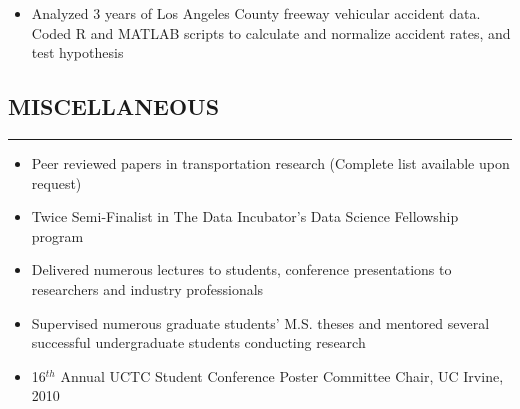 \documentclass[10pt,a4]{article}
\def\mydot{\textcolor{deep_blue}{\rule{0.75ex}{0.75ex}}}
\begin{document}
\begin{small}
\begin{itemize}
\item[\mydot] Analyzed 3 years of Los Angeles County freeway vehicular accident data. Coded R and MATLAB scripts to calculate and normalize accident rates, and test hypothesis
\end{itemize}



\vspace{-0.55cm}
\subsection*{\color{dark_blue} MISCELLANEOUS}
\vspace{-0.15cm}
\hrule
\vspace{0.1cm}
\begin{itemize}
\item[\mydot] Peer reviewed papers in transportation research (Complete list available upon request)
\item[\mydot] Twice Semi-Finalist in The Data Incubator's Data Science Fellowship program
\item[\mydot] Delivered numerous lectures to students, conference presentations to researchers and industry professionals
\item[\mydot] Supervised numerous graduate students' M.S. theses and mentored several successful undergraduate students conducting research 
\item[\mydot] 16$^{th}$ Annual UCTC Student Conference Poster Committee Chair, UC Irvine, 2010

\end{itemize}




\end{small}
\end{document}
